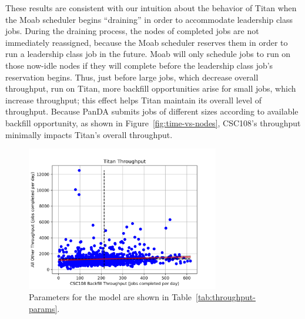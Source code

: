These results are consistent with our intuition about the behavior of Titan
when the Moab scheduler begins ``draining'' in order to accommodate leadership
class jobs. During the draining process, the nodes of completed jobs are not
immediately reassigned, because the Moab scheduler reserves them in order to
run a leadership class job in the future. Moab will only schedule jobs to run
on those now-idle nodes if they will complete before the leadership class job's
reservation begins. Thus, just before large jobs, which decrease overall
throughput, run on Titan, more backfill opportunities arise for small jobs,
which increase throughput; this effect helps Titan maintain its overall level
of throughput. Because PanDA submits jobs of different sizes according to
available backfill opportunity, as shown in Figure~\ref{fig:time-vs-nodes},
CSC108's throughput minimally impacts Titan's overall throughput.

\begin{figure}
  \includegraphics[width=0.75\textwidth]{images/linfit-throughput-all.png}
\caption{Parameters for the model are shown in
    Table~\ref{tab:throughput-params}.}
\label{fig:throughput-all}
\end{figure}

